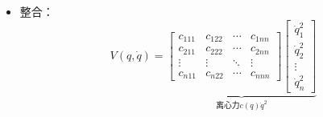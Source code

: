 \documentclass[
12pt, %
a4paper, 
oneside, %
headinclude,footinclude, %
]{scrartcl}
\begin{document}
\begin{itemize}
故：
{\footnotesize
$$
\textcolor{blue}{\begin{bmatrix} \dot{q}^T \frac{\partial M(q)}{\partial q_1}\dot{q} \\ \vdots \\ \dot{q}^T \frac{\partial M(q)}{\partial q_n}\dot{q} \end{bmatrix}} 
= \begin{bmatrix} b_{1,1,1} & b_{2,2,1} & \cdots & b_{n,n,1} \\ b_{1,1,2} & b_{2,2,2} & \cdots & b_{n,n,2} \\ \vdots & \vdots & \ddots & \vdots \\ b_{1,1,n} & b_{2,2,n} & \cdots & b_{n,n,n} \end{bmatrix} \begin{bmatrix} \dot{q}_1^2 \\ \dot{q}_2^2 \\ \vdots \\ \dot{q}_n^2 \end{bmatrix}
+ 2\begin{bmatrix} b_{1,2,1} & b_{1,3,1} & \cdots & b_{n - 1,n,1} \\ b_{1,2,2} & b_{1,3,2} & \cdots & b_{n - 1,n,2} \\ \vdots & \vdots & \ddots & \vdots \\ b_{1,2,n} & b_{1,3,n} & \cdots & b_{n - 1,n,n} \end{bmatrix}_{n \times \frac{n^2 - n}{2}} \begin{bmatrix} \dot{q}_1 \dot{q}_2 \\ \dot{q}_1 \dot{q}_3 \\ \vdots \\ \dot{q}_{n - 1} \dot{q}_n \end{bmatrix}_{\frac{n^2 - n}{2}}
$$
}
\item 整合：
$$
V(q, \dot{q}) = 
\underbrace{\begin{bmatrix} c_{111} & c_{122} & \cdots & c_{1nn} \\ c_{211} & c_{222} & \cdots & c_{2nn} \\ \vdots & \vdots & \ddots & \vdots \\ c_{n11} & c_{n22} & \cdots & c_{nnn} \end{bmatrix} \begin{bmatrix} \dot{q}_1^2 \\ \dot{q}_2^2 \\ \vdots \\ \dot{q}_n^2 \end{bmatrix}}_{\text{离心力}c(q) \dot{q}^2}
$$
\end{itemize}
\end{document}
